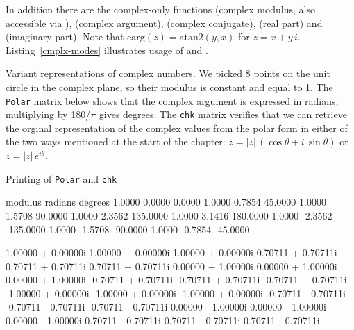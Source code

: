In addition there are the complex-only functions 
(complex modulus, also accessible via ), 
(complex argument),  (complex conjugate), 
(real part) and  (imaginary part). Note that
$\mbox{carg}(z) = \mbox{atan2}(y,x)$ for $z=x +
y\,i$. Listing~\ref{cmplx-modes} illustrates usage of 
and .

\begin{script}[htbp]
  \caption{Variant representations of complex numbers. We picked 8
    points on the unit circle in the complex plane, so their modulus
    is constant and equal to 1. The \texttt{Polar} matrix below shows
    that the complex argument is expressed in radians; multiplying by
    180/$\pi$ gives degrees. The \texttt{chk} matrix verifies that
    we can retrieve the orginal representation of the complex values
    from the polar form in either of the two ways mentioned at the
    start of the chapter: $z = |z|\,(\cos \theta + i\,\sin \theta)$ or
    $z = |z|\,e^{i\theta}$.}
  \label{cmplx-modes}
  Printing of \texttt{Polar} and \texttt{chk}
\begin{outbit}
     modulus     radians     degrees
      1.0000      0.0000      0.0000
      1.0000      0.7854     45.0000
      1.0000      1.5708     90.0000
      1.0000      2.3562    135.0000
      1.0000      3.1416    180.0000
      1.0000     -2.3562   -135.0000
      1.0000     -1.5708    -90.0000
      1.0000     -0.7854    -45.0000

 1.00000 + 0.00000i   1.00000 + 0.00000i   1.00000 + 0.00000i
 0.70711 + 0.70711i   0.70711 + 0.70711i   0.70711 + 0.70711i
 0.00000 + 1.00000i   0.00000 + 1.00000i   0.00000 + 1.00000i
-0.70711 + 0.70711i  -0.70711 + 0.70711i  -0.70711 + 0.70711i
-1.00000 + 0.00000i  -1.00000 + 0.00000i  -1.00000 + 0.00000i
-0.70711 - 0.70711i  -0.70711 - 0.70711i  -0.70711 - 0.70711i
 0.00000 - 1.00000i   0.00000 - 1.00000i   0.00000 - 1.00000i
 0.70711 - 0.70711i   0.70711 - 0.70711i   0.70711 - 0.70711i
\end{outbit}
\end{script}


